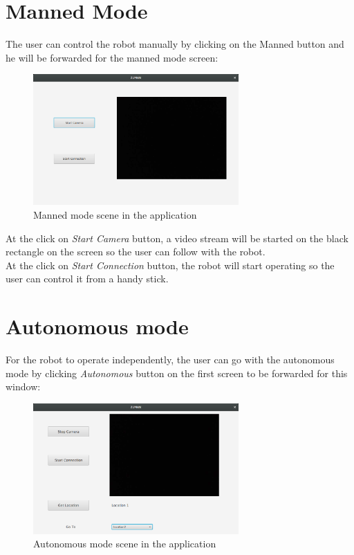 \documentclass[12pt]{book}
\begin{document}
\section{Manned Mode}
The user can control the robot manually by clicking on the Manned button and he will be forwarded for the manned mode screen:

\begin{figure}
	\centering
	\includegraphics[width =0.7\textwidth]{Fig/manned-mode.png}
	\caption{Manned mode scene in the application}
	\label{fig:manned-mode}
\end{figure}

\noindent At the click on \textit{Start Camera} button, a video stream will be started on the black rectangle on the screen so the user can follow with the robot.\\
At the click on \textit{Start Connection} button, the robot will start operating so the user can control it from a
handy stick.

\section{Autonomous mode}
For the robot to operate independently, the user can go with the autonomous mode by clicking \textit{Autonomous} button on the first screen to be forwarded for this window:

\begin{figure}
	\centering
	\includegraphics[width =0.7\textwidth]{Fig/auto-mode.png}
	\caption{Autonomous mode scene in the application}
	\label{fig:auto-mode}
\end{figure}
\end{document}
